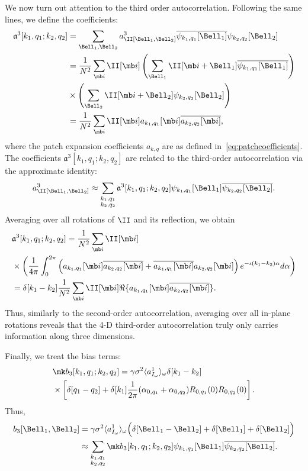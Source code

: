 \documentclass[9pt,twocolumn,twoside,lineno]{pnas-new}
\begin{document}
We now turn out attention to the third order autocorrelation. Following the same lines, we define the coefficients:
\[\begin{aligned} \mathfrak{a}^3[k_1,q_1;k_2,q_2] &= \sum_{\Bell_1, \Bell_2} a^3_\II[\Bell_1,\Bell_2]\overline{\psi_{k_1,q_1}[\Bell_1]}\psi_{k_2,q_2}[\Bell_2]\\
&= \frac{1}{N^2}\sum_{\mb i}\II[\mb i]\left(\sum_{\Bell_1}\II[\mb i+\Bell_1]\overline{\psi_{k_1,q_1}[\Bell_1]}\right)\\&\times \left(\sum_{\Bell_2}\II[\mb i+\Bell_2]\psi_{k_2,q_2}[\Bell_2]\right)\\
&= \frac{1}{N^2}\sum_{\mb i}\II[\mb i] a_{k_1,q_1}[\mb i]\overline{a_{k_2,q_2}[\mb i]},
\end{aligned}\]
where the patch expansion coefficients $a_{k,q}$ are as defined in~\eqref{eq:patchcoefficients}.
The coefficients $\mathfrak{a}^3[k_1,q_1;k_2,q_2]$ are related to the third-order autocorrelation via the approximate identity:
\[ a^3_\II[\Bell_1, \Bell_2] \approx \sum_{\substack{k_1,q_1\\ k_2,q_2}}\mathfrak{a}^3[k_1,q_1;k_2,q_2]\psi_{k_1,q_1}[\Bell_1]\overline{\psi_{k_2,q_2}[\Bell_2]}.\]
Averaging over all rotations of $\II$ and its reflection, we obtain
\begin{align} \label{eq:third_order_ac_pswf}
&\mathfrak{a}^3[k_1,q_1;k_2,q_2] = \frac{1}{N^2}\sum_{\mb i}\II[\mb i]\\&\times \left(\frac{1}{4\pi}\int_0^{2\pi}\left(a_{k_1,q_1}[\mb i]\overline{a_{k_2,q_2}[\mb i]} + \overline{a_{k_1,q_1}[\mb i]}a_{k_2,q_2}[\mb i]\right)e^{-\iota(k_1-k_2)\alpha}d\alpha\right) \nonumber\\
&= \delta[k_1 - k_2]\frac{1}{N^2}\sum_{\mb i}\II[\mb i]\Re\{a_{k_1,q_1}[\mb i]\overline{a_{k_2,q_2}[\mb i]}\}. \nonumber 
\end{align}
Thus, similarly to the second-order autocorrelation, averaging over all in-plane rotations reveals that the 4-D third-order autocorrelation truly only carries information along three dimensions.

Finally, we treat the bias terms:
\begin{align*}
&\mk b_3[k_1,q_1; k_2,q_2] = \gamma\sigma^2\langle a^1_{I_{\omega}} \rangle_\omega \delta[k_1 - k_2]\\&\times \left[\delta[q_1-q_2] + \delta[k_1]\frac{1}{2\pi}(\alpha_{0,q_1} + \alpha_{0,q_2})R_{0,q_1}(0)R_{0,q_2}(0)\right].
\end{align*}
%
Thus,
\begin{align*}
b_3[\Bell_1, \Bell_2] & = \gamma\sigma^2\langle a^1_{I_{\omega}}\rangle_{\omega}\Big(\delta[\Bell_1 - \Bell_2] +
\delta[\Bell_1] + \delta[\Bell_2]\Big) \\
& \approx \sum_{\substack{k_1, q_1\\ k_2, q_2}} \mk 
b_3[k_1,q_1; k_2, q_2]\psi_{k_1,q_1}[\Bell_1]\overline{\psi_{k_2,q_2}[\Bell_2]}.
\end{align*}
\end{document}
